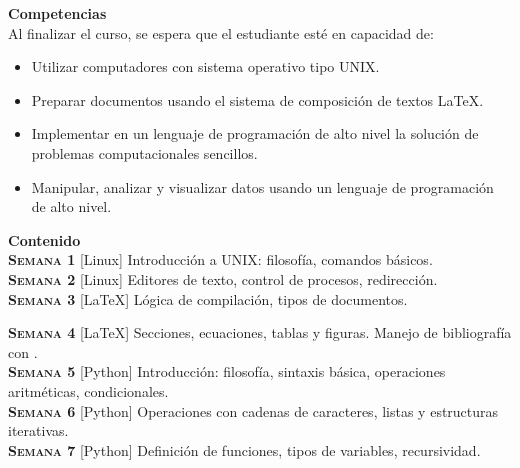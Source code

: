 \documentclass[letterpaper,10pt,onecolumn]{article}
\begin{document}
\noindent\textbf{\large {} \quad Competencias}\\[-0.2cm]

\noindent\normalsize Al finalizar el curso, se espera que el estudiante esté en capacidad de:

\begin{itemize}
	\item Utilizar computadores con sistema operativo tipo UNIX.\\[-0.6cm]
	\item Preparar documentos usando el sistema de composición de textos \LaTeX.\\[-0.6cm]
	\item Implementar en un lenguaje de programación de alto nivel la solución de problemas computacionales sencillos.\\[-0.6cm]
	\item Manipular, analizar y visualizar datos usando un lenguaje de programación de alto nivel.\\[-0.2cm]
\end{itemize}

\noindent\textbf{\large {} \quad Contenido}\\[-0.2cm]

\noindent\normalsize \textbf{\textsc{Semana 1}} [Linux]
Introducción a UNIX: filosofía, comandos básicos.
\\[-0.3cm] 

\noindent\textbf{\textsc{Semana 2}}  [Linux] Editores de texto,
control de procesos, redirección. \\[-0.3cm]  

\noindent\textbf{\textsc{Semana 3}} [\LaTeX] Lógica de
compilación, tipos de documentos.

\noindent\textbf{\textsc{Semana 4}} [\LaTeX] Secciones, ecuaciones, tablas y
figuras. Manejo de bibliografía con \BibTeX.\\[-0.3cm]   

\noindent\textbf{\textsc{Semana 5}} [Python] Introducción: filosofía,
sintaxis básica, operaciones aritméticas, condicionales.\\[-0.3cm]   

\noindent\textbf{\textsc{Semana 6}} [Python] Operaciones con cadenas de
caracteres, listas y estructuras iterativas.\\[-0.3cm] 

\noindent\textbf{\textsc{Semana 7}} [Python] Definición de funciones,
tipos de variables, recursividad. \\[-0.3cm] 
\end{document}

